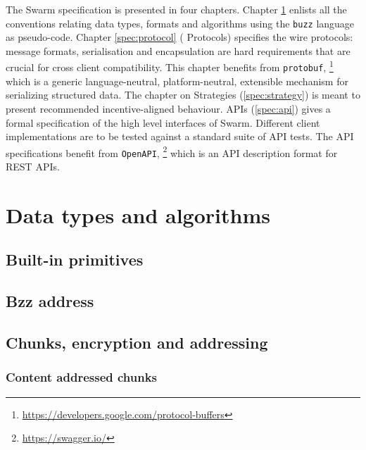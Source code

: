 
The Swarm specification is presented in four chapters. Chapter \ref{spec:convention} enlists all the conventions relating data types, formats and algorithms using the \lstinline{buzz} language as pseudo-code.
Chapter \ref{spec:protocol} ( Protocols) specifies the wire protocols: message formats, serialisation and encapsulation are hard requirements that are crucial for  cross client compatibility. This chapter benefits from \lstinline{protobuf},%
%
\footnote{\url{https://developers.google.com/protocol-buffers}}
%
which is a generic language-neutral, platform-neutral, extensible mechanism for serializing structured data.
The chapter on Strategies (\ref{spec:strategy}) is meant to present recommended incentive-aligned behaviour.
APIs (\ref{spec:api}) gives a formal specification of the high level interfaces of Swarm. Different client implementations are  to be tested against a standard suite of API tests. The API specifications benefit from \lstinline{OpenAPI},%
%
\footnote{\url{https://swagger.io/}}
%
which is an API description format for REST APIs.

\newpage{} 
{}
\listoftheorems[ignoreall,show={definition}]

\chapter{Data types and algorithms}\label{spec:convention}

\orange{}

\section{Built-in primitives \statusyellow}\label{spec:format:builtin}


\section{Bzz address\statusgreen}\label{spec:format:bzzaddress}


\section{Chunks, encryption and addressing\statusyellow}
\subsection{Content addressed chunks \statusgreen}\label{spec:format:chunks}

